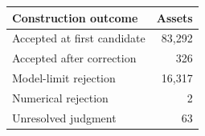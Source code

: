 \begin{tabular}{lr}
\toprule
Construction outcome & Assets \\
\midrule
Accepted at first candidate & 83,292 \\
Accepted after correction & 326 \\
Model-limit rejection & 16,317 \\
Numerical rejection & 2 \\
Unresolved judgment & 63 \\
\bottomrule
\end{tabular}
